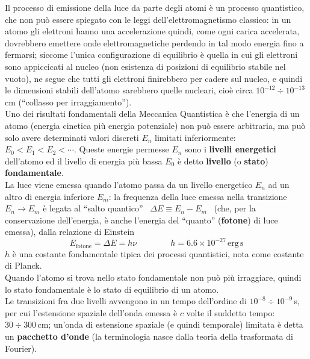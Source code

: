 Il processo di emissione della luce da parte degli atomi \`e un processo
quantistico, che non pu\`o essere spiegato con le leggi dell'elettromagnetismo
classico: in un atomo gli elettroni hanno una accelerazione quindi, come ogni
carica accelerata, dovrebbero emettere onde elettromagnetiche perdendo in tal
modo energia fino a fermarsi; siccome l'unica configurazione di equilibrio \`e
quella in cui gli elettroni sono appiccicati al nucleo (non esistenza di
posizioni di equilibrio stabile nel vuoto), ne segue che tutti gli elettroni
finirebbero per cadere sul nucleo, e quindi le dimensioni stabili dell'atomo
sarebbero quelle nucleari, cio\`e circa $10^{-12}\div10^{-13}$\,cm (``collasso
per irraggiamento'').\\
Uno dei risultati fondamentali della Meccanica Quantistica \`e che l'energia di
un atomo (energia cinetica pi\`u energia potenziale) non pu\`o essere
arbitraria, ma pu\`o solo avere determinati valori discreti $E_n$ limitati
inferiormente: \ $E_0<E_1<E_2<\cdots$. Queste
energie permesse $E_n$ sono i \textbf{livelli energetici} dell'atomo ed il
livello di energia pi\`u bassa $E_0$ \`e detto \textbf{livello} (o
\textbf{stato}) \textbf{fondamentale}.\\
La luce viene emessa quando l'atomo passa da un livello energetico $E_n$ ad un
altro di energia inferiore $E_m$: la frequenza della luce emessa nella
transizione $E_n\to E_m$ \`e legata al ``salto quantico''
\ $\Delta E\equiv E_n-E_m$ \ (che, per la conservazione dell'energia, \`e anche
l'energia del ``quanto'' (\textbf{fotone}) di luce emessa), dalla relazione di
Einstein
\begin{equation}
  E_\mathrm{fotone}=\Delta E=h\nu
  \qquad\qquad h=6.6\times10^{-27}\,\mathrm{erg\,s}
  \tag{13.16}
\end{equation}
$h$ \`e una costante fondamentale tipica dei processi quantistici, nota come
costante di Planck.\\
Quando l'atomo si trova nello stato fondamentale non pu\`o pi\`u irraggiare,
quindi lo stato fondamentale \`e lo stato di equilibrio di un atomo.\\
Le transizioni fra due livelli avvengono in un tempo dell'ordine di
$10^{-8}\div10^{-9}$\,s, per cui l'estensione spaziale dell'onda emessa \`e $c$
volte il suddetto tempo: $30\div300$\,cm; un'onda di estensione spaziale (e
quindi temporale) limitata \`e detta un \textbf{pacchetto d'onde} (la
terminologia nasce dalla teoria della trasformata di Fourier).

